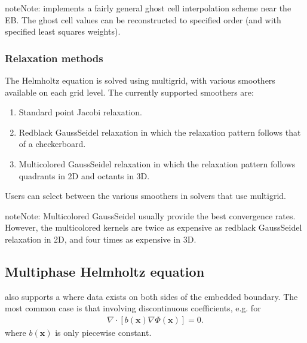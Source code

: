 \documentclass[letterpaper,10pt,english]{sphinxmanual}
\begin{document}
\begin{sphinxadmonition}{note}{Note:}
 implements a fairly general ghost cell interpolation scheme near the EB. The ghost cell values can be reconstructed to specified order (and with specified least squares weights).
\end{sphinxadmonition}


\subsubsection{Relaxation methods}
\label{\detokenize{Source/LinearSolvers:relaxation-methods}}
The Helmholtz equation is solved using multigrid, with various smoothers available on each grid level.
The currently supported smoothers are:
\begin{enumerate}
%
\item {} 
Standard point Jacobi relaxation.

\item {} 
Red\sphinxhyphen{}black Gauss\sphinxhyphen{}Seidel relaxation in which the relaxation pattern follows that of a checkerboard.

\item {} 
Multi\sphinxhyphen{}colored Gauss\sphinxhyphen{}Seidel relaxation in which the relaxation pattern follows quadrants in 2D and octants in 3D.

\end{enumerate}

Users can select between the various smoothers in solvers that use multigrid.

\begin{sphinxadmonition}{note}{Note:}
Multi\sphinxhyphen{}colored Gauss\sphinxhyphen{}Seidel usually provide the best convergence rates.
However, the multi\sphinxhyphen{}colored kernels are twice as expensive as red\sphinxhyphen{}black Gauss\sphinxhyphen{}Seidel relaxation in 2D, and four times as expensive in 3D.
\end{sphinxadmonition}


\subsection{Multiphase Helmholtz equation}
\label{\detokenize{Source/LinearSolvers:multiphase-helmholtz-equation}}
 also supports a  where data exists on both sides of the embedded boundary.
The most common case is that involving discontinuous coefficients, e.g. for
\begin{equation*}
\begin{split}\nabla\cdot\left[b\left(\mathbf{x}\right)\nabla\Phi\left(\mathbf{x}\right)\right] = 0.\end{split}
\end{equation*}
where \(b\left(\mathbf{x}\right)\) is only piecewise constant.
\end{document}
